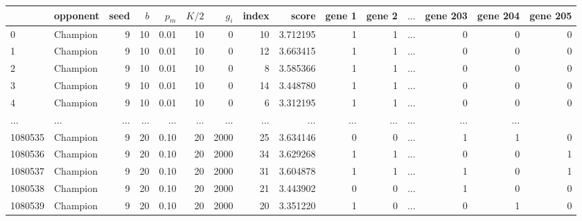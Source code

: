 \begin{tabular}{llrrrrrrrrrrrrr}
\toprule
{} &  opponent &  seed &  $b$ &  $p_m$ &  $K/2$ &  $g_i$ &  index &     score &  gene 1 &  gene 2 &  \(\dots\) &  gene 203 &  gene 204 &  gene 205 \\
\midrule
0       &  Champion &     9 &   10 &   0.01 &     10 &      0 &     10 &  3.712195 &       1 &       1 & \(\dots\) &  0 &         0 &         0 \\
1       &  Champion &     9 &   10 &   0.01 &     10 &      0 &     12 &  3.663415 &       1 &       1 & \(\dots\) &  0 &         0 &         0 \\
2       &  Champion &     9 &   10 &   0.01 &     10 &      0 &      8 &  3.585366 &       1 &       1 & \(\dots\) &  0 &         0 &         0 \\
3       &  Champion &     9 &   10 &   0.01 &     10 &      0 &     14 &  3.448780 &       1 &       1 & \(\dots\) &  0 &         0 &         0 \\
4       &  Champion &     9 &   10 &   0.01 &     10 &      0 &      6 &  3.312195 &       1 &       1 & \(\dots\) &  0 &         0 &         0 \\
\(\dots\)  &  \(\dots\)  &   \(\dots\)  &   \(\dots\)  & \(\dots\)  &  \(\dots\)  & \(\dots\)          & \(\dots\) &       \(\dots\)  &       \(\dots\)  &  \(\dots\)    & \(\dots\)  &         \(\dots\)  &         \(\dots\)  \\
1080535 &  Champion &     9 &   20 &   0.10 &     20 &   2000 &     25 &  3.634146 &       0 &       0 & \(\dots\) &  1 &         1 &         0 \\
1080536 &  Champion &     9 &   20 &   0.10 &     20 &   2000 &     34 &  3.629268 &       1 &       1 & \(\dots\) &  0 &         0 &         1 \\
1080537 &  Champion &     9 &   20 &   0.10 &     20 &   2000 &     31 &  3.604878 &       1 &       1 & \(\dots\) &  1 &         0 &         1 \\
1080538 &  Champion &     9 &   20 &   0.10 &     20 &   2000 &     21 &  3.443902 &       0 &       0 & \(\dots\) &  1 &         0 &         0 \\
1080539 &  Champion &     9 &   20 &   0.10 &     20 &   2000 &     20 &  3.351220 &       1 &       0 & \(\dots\) &  0 &         1 &         0 \\
\bottomrule
\end{tabular}
